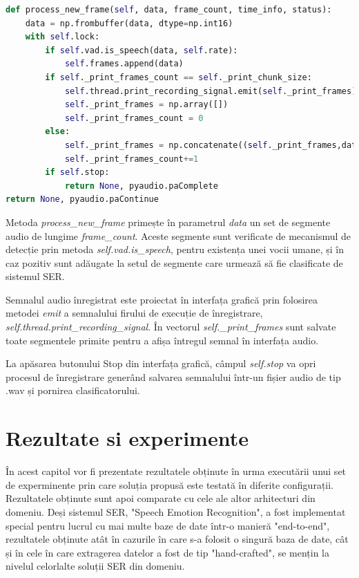 \documentclass[a4paper,12pt]{book}
\begin{document}
\begin{lstlisting}[language=Python, caption={Procesarea unui nou segment al semnalului audio înregistrat. Daca segmentul nu conține discurs uman este exclus din înregistrarea finală.}]		
def process_new_frame(self, data, frame_count, time_info, status):
	data = np.frombuffer(data, dtype=np.int16)
	with self.lock:
		if self.vad.is_speech(data, self.rate):
			self.frames.append(data)
		if self._print_frames_count == self._print_chunk_size:
			self.thread.print_recording_signal.emit(self._print_frames)
			self._print_frames = np.array([])
			self._print_frames_count = 0
		else:
			self._print_frames = np.concatenate((self._print_frames,data), axis=0)
			self._print_frames_count+=1
		if self.stop:
			return None, pyaudio.paComplete
return None, pyaudio.paContinue	\end{lstlisting}
		Metoda \textit{process\_new\_frame} primește în parametrul \textit{data} un set de segmente audio de lungime \textit{frame\_count}. Aceste segmente sunt verificate de mecanismul de detecție prin metoda \textit{self.vad.is\_speech}, pentru existența unei vocii umane, și în caz pozitiv sunt adăugate la setul de segmente care urmează să fie clasificate de sistemul SER. \par
		Semnalul audio înregistrat este proiectat în interfața grafică prin folosirea metodei \textit{emit} a semnalului firului de execuție de înregistrare, \textit{self.thread.print\_recording\_signal}. În vectorul \textit{self.\_print\_frames} sunt salvate toate segmentele primite pentru a afișa întregul semnal în interfața audio. \par
		La apăsarea butonului Stop din interfața grafică, câmpul \textit{self.stop} va opri procesul de înregistrare generând salvarea semnalului într-un fișier audio de tip .wav și pornirea clasificatorului.
		
		 
		\chapter{Rezultate si experimente} \label{rezultate}
		 
		 În acest capitol vor fi prezentate rezultatele obținute în urma executării unui set de experminente prin care soluția propusă este testată în diferite configurații. Rezultatele obținute sunt apoi comparate cu cele ale altor arhitecturi din domeniu. Deși sistemul SER, "Speech Emotion Recognition", a fost implementat special pentru lucrul cu mai multe baze de date într-o manieră "end-to-end", rezultatele obținute atât în cazurile în care s-a folosit o singură baza de date, cât și în cele în care extragerea datelor a fost de tip "hand-crafted", se mențin la nivelul celorlalte soluții SER din domeniu.\par
		 
\end{document}
